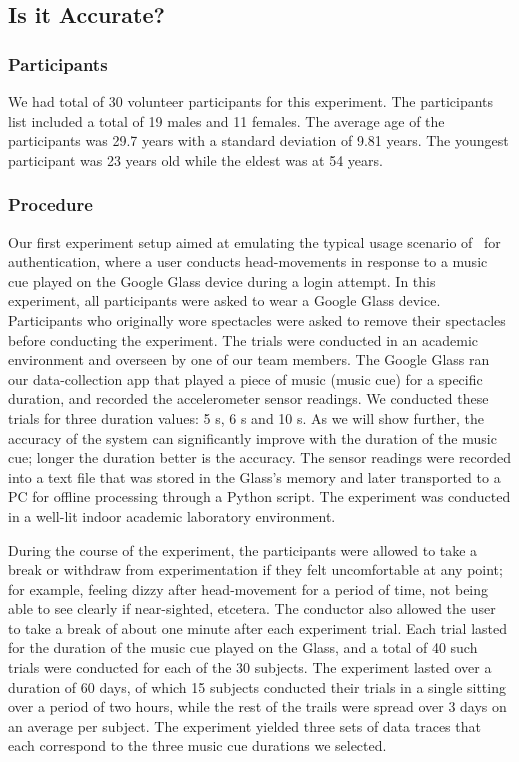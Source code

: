 \subsection{Is it Accurate?}

\subsubsection{Participants}

We had total of 30 volunteer participants for this experiment. The participants list included a total of 19 males and 11 females. 
The average age of the participants was 29.7 years with a standard deviation 
of 9.81 years. The youngest participant was 23 years old while the eldest was 
at 54 years.

\subsubsection{Procedure}
Our first experiment setup aimed at emulating the typical usage scenario 
of \systemname~for authentication, where a user conducts head-movements in 
response to a music cue played on the Google Glass device during a login 
attempt. 
In this experiment, all participants were asked to wear a Google Glass 
device. Participants who originally wore spectacles were asked to remove their
spectacles before conducting the experiment.
The trials were conducted in an academic environment and overseen by one of 
our team members.
The Google Glass ran our data-collection app that played a piece of 
music (music cue) for a specific duration, and recorded the accelerometer 
sensor readings. We conducted these trials for three duration values: 5 s, 
6 s and 10 s. As we will show further, the accuracy of the system can 
significantly improve with the duration of the music cue; longer the duration 
better is the accuracy. 
The sensor readings were recorded into a text file that was stored 
in the Glass's memory and later transported to a PC for offline processing
through a Python script. The experiment was conducted in a well-lit indoor 
academic laboratory environment. 
 
During the course of the experiment, the participants were allowed to take a 
break or withdraw from experimentation if they felt uncomfortable at any 
point; for example, feeling 
dizzy after head-movement for a period of time, not being able to see clearly 
if near-sighted, etcetera. The conductor also allowed the user to take a break 
of about one minute after each experiment trial.
Each trial lasted for the duration of the music cue played on the Glass, and 
a total of 40 such trials were conducted for each of the 30 subjects. 
The experiment lasted over a duration of 60 days, of which 15 
subjects conducted their trials in a single sitting over a period of two 
hours, while the rest of the trails were spread over 3 days on an average per 
subject.
The experiment yielded three sets of data traces that each correspond to 
the three music cue durations we selected. 

